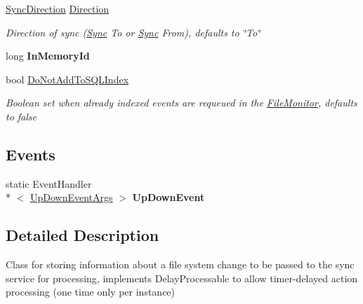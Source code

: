 \begin{DoxyCompactItemize}
\hyperlink{namespace_cloud_api_public_1_1_static_a8ba5d1f6d06fa058730616f021c8974f}{Sync\-Direction} \hyperlink{class_cloud_api_public_1_1_model_1_1_file_change_ae9286566d391fe9d646db55e20b1ccab}{Direction}
\begin{DoxyCompactList}\small\item\em Direction of sync (\hyperlink{namespace_cloud_api_public_1_1_sync}{Sync} To or \hyperlink{namespace_cloud_api_public_1_1_sync}{Sync} From), defaults to \char`\"{}\-To\char`\"{} \end{DoxyCompactList}\item 
\hypertarget{class_cloud_api_public_1_1_model_1_1_file_change_a150bd50fceae6c179f1bc34debb933e5}{long {\bfseries In\-Memory\-Id}}\label{class_cloud_api_public_1_1_model_1_1_file_change_a150bd50fceae6c179f1bc34debb933e5}

\item 
bool \hyperlink{class_cloud_api_public_1_1_model_1_1_file_change_aa979e65ac9cd9783870afe5b25137296}{Do\-Not\-Add\-To\-S\-Q\-L\-Index}
\begin{DoxyCompactList}\small\item\em Boolean set when already indexed events are requeued in the \hyperlink{namespace_cloud_api_public_1_1_file_monitor}{File\-Monitor}, defaults to false \end{DoxyCompactList}\end{DoxyCompactItemize}
\subsection*{Events}
\begin{DoxyCompactItemize}
\item 
\hypertarget{class_cloud_api_public_1_1_model_1_1_file_change_aa21bd352b70154e019ff6cf0069396e9}{static Event\-Handler\\*
$<$ \hyperlink{class_cloud_api_public_1_1_model_1_1_file_change_1_1_up_down_event_args}{Up\-Down\-Event\-Args} $>$ {\bfseries Up\-Down\-Event}}\label{class_cloud_api_public_1_1_model_1_1_file_change_aa21bd352b70154e019ff6cf0069396e9}

\end{DoxyCompactItemize}


\subsection{Detailed Description}
Class for storing information about a file system change to be passed to the sync service for processing, implements Delay\-Processable to allow timer-\/delayed action processing (one time only per instance) 



